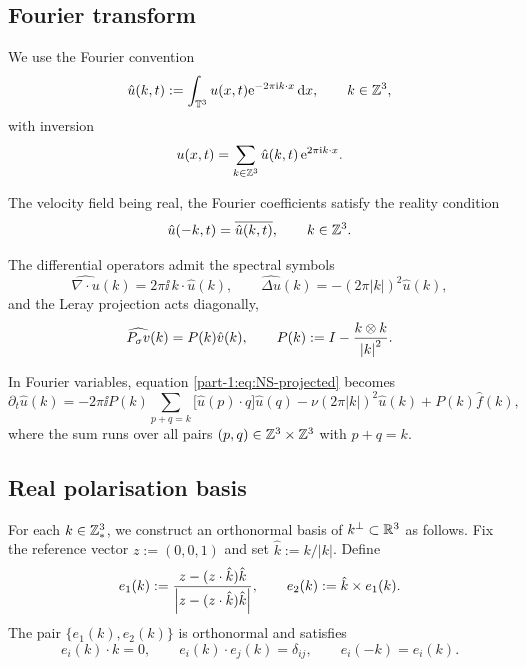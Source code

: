 \subsection{Fourier transform}
\label{part-1:ssec:Fourier}

We use the Fourier convention
\begin{equation}\label{part-1:eq:Fourier}
\hat u(k,t) := \int_{\mathbb{T}^3} u(x,t) \mathrm{e}^{-2\pi \mathrm{i} k\cdot x}\,\mathrm{d} x,
\qquad k\in\mathbb{Z}^3,
\end{equation}
with inversion
\begin{equation}\label{part-1:eq:Fourier-inverse}
u(x,t) = \sum_{k\in\mathbb{Z}^3} \hat u(k,t)\, \mathrm{e}^{2\pi \mathrm{i} k\cdot x}.
\end{equation}

The velocity field being real, the Fourier coefficients satisfy the 
reality condition
\begin{equation}\label{part-1:eq:reality}
\hat u(-k,t) = \overline{\hat u(k,t)}, \qquad k\in\mathbb{Z}^3.
\end{equation}

The differential operators admit the spectral symbols
\begin{equation}\label{part-1:eq:symbols}
\widehat{\nabla\cdot u}(k) = 2\pi\ii\, k\cdot\hat u(k),
\qquad
\widehat{\Delta u}(k) = -(2\pi|k|)^2 \hat u(k),
\end{equation}
and the Leray projection acts diagonally,
\begin{equation}\label{part-1:eq:Leray-symbol}
\widehat{P_\sigma v}(k) = P(k) \hat v(k),
\qquad
P(k) := I - \frac{k\otimes k}{\left\lvert k \right\rvert^2}.
\end{equation}

In Fourier variables, equation \eqref{part-1:eq:NS-projected} becomes
\begin{equation}\label{part-1:eq:NS-Fourier}
\partial_t \hat u(k) 
= -2\pi\ii P(k)\!\!\sum_{p+q=k}\!\! \bigl[\hat u(p)\cdot q\bigr]\hat u(q)
- \nu(2\pi|k|)^2 \hat u(k) + P(k) \hat f(k),
\end{equation}
where the sum runs over all pairs $(p,q)\in\mathbb{Z}^3\times\mathbb{Z}^3$ with 
$p+q=k$.

\subsection{Real polarisation basis}
\label{part-1:ssec:real-pol}

For each $k\in\mathbb{Z}^3_\ast$, we construct an orthonormal basis of 
$k^\perp\subset\mathbb{R}^3$ as follows. Fix the reference vector 
$z := (0,0,1)$ and set $\hat k := k/|k|$. Define
\begin{equation}\label{part-1:eq:e1e2}
e_1(k) := \frac{z - (z\cdot\hat k)\hat k}{\left\lvert z - (z\cdot\hat k)\hat k \right\rvert},
\qquad
e_2(k) := \hat k \times e_1(k).
\end{equation}
The pair $\{e_1(k),e_2(k)\}$ is orthonormal and satisfies
\begin{equation}\label{part-1:eq:polarisation-properties}
e_i(k)\cdot k = 0, \qquad
e_i(k)\cdot e_j(k) = \delta_{ij}, \qquad
e_i(-k) = e_i(k).
\end{equation}

